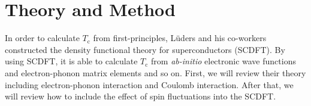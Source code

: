 

%
%
\chapter{Theory and Method}
%
%
%
%
In order to calculate $T_\mathrm{c}$ from first-principles, 
L\"{u}ders and his co-workers constructed the density functional theory 
for superconductors (SCDFT)\cite{Luders2005_1}.
By using SCDFT, it is able to calculate $T_\mathrm{c}$ from {\it ab-initio} electronic wave functions
 and electron-phonon matrix elements and so on. 
First, we will review their theory including electron-phonon interaction and Coulomb interaction. 
After that, we will review how to include the effect of spin fluctuations into the SCDFT.

